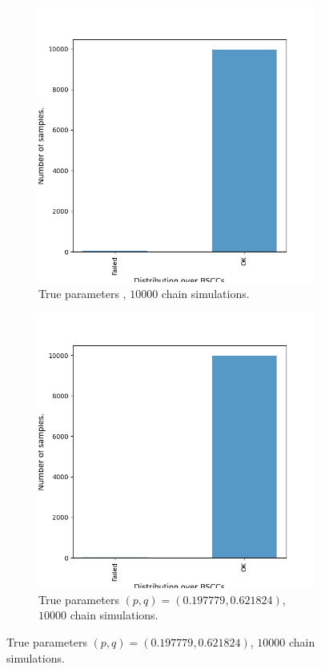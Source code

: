 \begin{figure}[H]
    \centering
    \begin{subfigure}{0.48\textwidth}
        \centering
        \includegraphics[width=\linewidth]{figures/zeroconf4_data.png}
        \caption{True parameters , $10000$ chain simulations.}
    \end{subfigure}
    \hfill
    \begin{subfigure}{0.48\textwidth}
        \centering
        \includegraphics[width=\linewidth]{figures/zeroconf10_data.png}
        \caption{True parameters $(p,q)=(0.197779, 0.621824)$, $10000$ chain simulations.}
    \end{subfigure}
\end{figure}


